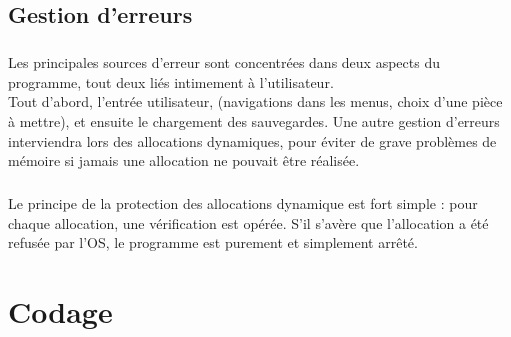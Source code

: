 \documentclass{report}
\begin{document}
    \section*{Gestion d'erreurs}
        \paragraph*{}
        Les principales sources d'erreur sont concentrées dans deux aspects du programme, tout deux liés intimement à l'utilisateur.\\
        Tout d'abord, l'entrée utilisateur, (navigations dans les menus, choix d'une pièce à mettre), et ensuite le chargement des sauvegardes.
        Une autre gestion d'erreurs interviendra lors des allocations dynamiques, pour éviter de grave problèmes de mémoire si jamais une allocation ne pouvait être réalisée.

        \paragraph*{} %

        \paragraph*{} %

        \paragraph*{} %
        Le principe de la protection des allocations dynamique est fort simple : pour chaque allocation, une vérification est opérée. S'il s'avère que l'allocation a été refusée par l'OS,
        le programme est purement et simplement arrêté.



\chapter{Codage}
\end{document}
